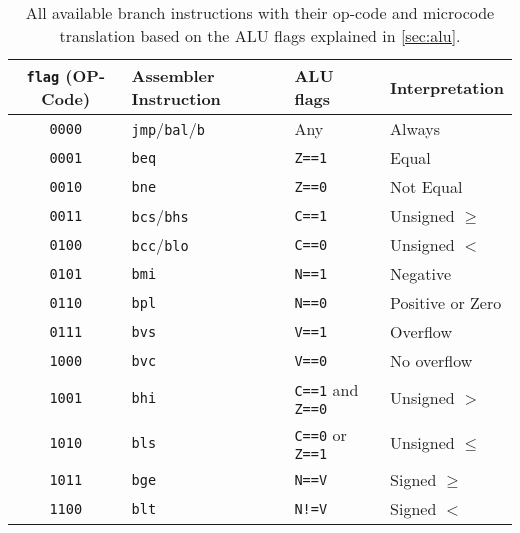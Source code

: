 \begin{table}[t]
  \centering
  \renewcommand{\arraystretch}{1.25}
  \caption{All available branch instructions with their op-code and microcode translation based on the \gls{ALU} flags explained in \cref{sec:alu}.}
  \label{tab:mc_flagMeanings}
  \begin{tabularx}{\textwidth}{ |c|l|l|X| }
    \hline
    \texttt{flag} (OP-Code) & Assembler Instruction                & \gls{ALU} flags                 & Interpretation   \\\hline\hline
    \texttt{0000}           & \texttt{jmp}/\texttt{bal}/\texttt{b} & Any                             & Always           \\\hline
    \texttt{0001}           & \texttt{beq}                         & \texttt{Z==1}                   & Equal            \\\hline
    \texttt{0010}           & \texttt{bne}                         & \texttt{Z==0}                   & Not Equal        \\\hline
    \texttt{0011}           & \texttt{bcs}/\texttt{bhs}            & \texttt{C==1}                   & Unsigned $\geq$  \\\hline
    \texttt{0100}           & \texttt{bcc}/\texttt{blo}            & \texttt{C==0}                   & Unsigned $<$     \\\hline
    \texttt{0101}           & \texttt{bmi}                         & \texttt{N==1}                   & Negative         \\\hline
    \texttt{0110}           & \texttt{bpl}                         & \texttt{N==0}                   & Positive or Zero \\\hline
    \texttt{0111}           & \texttt{bvs}                         & \texttt{V==1}                   & Overflow         \\\hline
    \texttt{1000}           & \texttt{bvc}                         & \texttt{V==0}                   & No overflow      \\\hline
    \texttt{1001}           & \texttt{bhi}                         & \texttt{C==1} and \texttt{Z==0} & Unsigned $>$     \\\hline
    \texttt{1010}           & \texttt{bls}                         & \texttt{C==0} or \texttt{Z==1}  & Unsigned $\leq$  \\\hline
    \texttt{1011}           & \texttt{bge}                         & \texttt{N==V}                   & Signed $\geq$    \\\hline
    \texttt{1100}           & \texttt{blt}                         & \texttt{N!=V}                   & Signed $<$       \\\hline

\end{tabularx}
\end{table}
